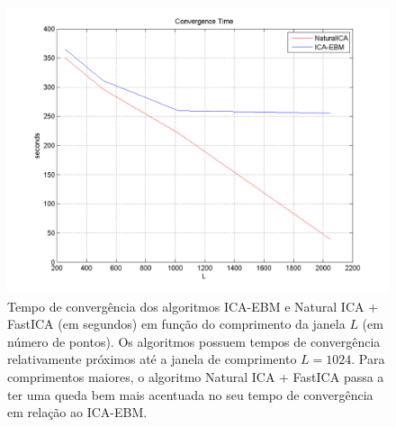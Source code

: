 \begin{figure}
    \centering
        \includegraphics[scale=0.8]{figuras/comparison_convergence_window.png}
            \caption{Tempo de convergência dos algoritmos ICA-EBM e Natural ICA + FastICA (em segundos) em função do comprimento da janela $L$ (em número de pontos). Os algoritmos possuem tempos de convergência relativamente próximos até a janela de comprimento $L=1024$. Para comprimentos maiores, o algoritmo Natural ICA + FastICA passa a ter uma queda bem mais acentuada no seu tempo de convergência em relação ao ICA-EBM.}
    \label{fig:comparison_convergence_window}
\end{figure}
